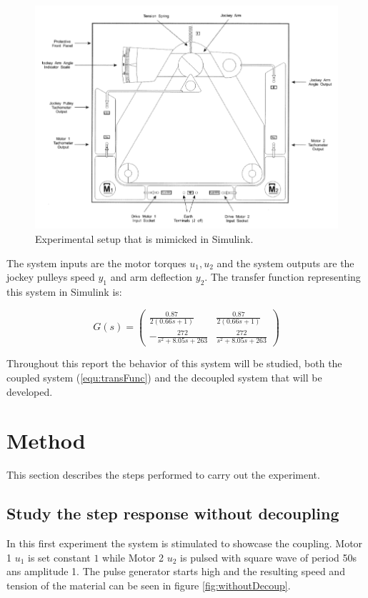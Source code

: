 \documentclass[a4paper, titlepage]{article}
\begin{document}
\begin{figure}[h!]
\center
\includegraphics[scale=0.65]{../figures/experimentSystem.png}
\caption{Experimental setup that is mimicked in Simulink.}
\label{fig:expSys}
\end{figure}

The system inputs are the motor torques $u_1, u_2$ and the system outputs are the jockey pulleys speed $y_1$ and arm deflection $y_2$.
The transfer function representing this system in Simulink is:

\begin{equation}
G(s) = 
\begin{pmatrix}
\frac{0.87}{2(0.66s + 1)} & \frac{0.87}{2(0.66s + 1)} \\[6pt]
-\frac{272}{s^2 + 8.05s + 263} & \frac{272}{s^2 + 8.05s + 263}
\end{pmatrix}
\label{equ:transFunc}
\end{equation}

Throughout this report the behavior of this system will be studied, both the coupled system (\ref{equ:transFunc}) and the decoupled system that will be developed.




\section{Method}
This section describes the steps performed to carry out the experiment.

\subsection{Study the step response without decoupling}
In this first experiment the system is stimulated to showcase the coupling.
Motor 1 $u_1$ is set constant $1$ while Motor 2 $u_2$ is pulsed with square wave of period 50s ans amplitude 1.
The pulse generator starts high and the resulting speed and tension of the material can be seen in figure \ref{fig:withoutDecoup}.
\end{document}
